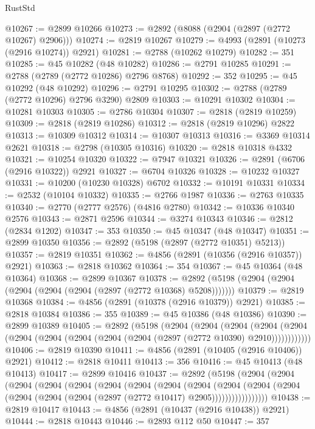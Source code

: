 \begin{lexlean}{RustStd}
\begin{coremodule}
@10267 := @2899 @10266
@10273 := @2892 (@8088 (@2904 (@2897 (@2772 @10267) @2906)))
@10274 := @2819 @10267
@10279 := @4993 (@2891 (@10273 (@2916 @10274)) @2921)
@10281 := @2788 (@10262 @10279)
@10282 := 351
@10285 := @45 @10282 (@48 @10282)
@10286 := @2791 @10285
@10291 := @2788 (@2789 (@2772 @10286) @2796 @8768)
@10292 := 352
@10295 := @45 @10292 (@48 @10292)
@10296 := @2791 @10295
@10302 := @2788 (@2789 (@2772 @10296) @2796 @3290) @2809
@10303 := @10291 @10302
@10304 := @10281 @10303
@10305 := @2786 @10304
@10307 := @2818 (@2819 @10259)
@10309 := @2818 (@2819 @10286)
@10312 := @2818 (@2819 @10296) @2822
@10313 := @10309 @10312
@10314 := @10307 @10313
@10316 := @3369 @10314 @2621
@10318 := @2798 (@10305 @10316)
@10320 := @2818 @10318 @4332
@10321 := @10254 @10320
@10322 := @7947 @10321
@10326 := @2891 (@6706 (@2916 @10322)) @2921
@10327 := @6704 @10326
@10328 := @10232 @10327
@10331 := @10200 (@10230 @10328) @6702
@10332 := @10191 @10331
@10334 := @2532 (@10104 @10332)
@10335 := @2766 @1987
@10336 := @2763 @10335
@10340 := @2770 (@2777 @2576) (@4816 @2780)
@10342 := @10336 @10340 @2576
@10343 := @2871 @2596
@10344 := @3274 @10343
@10346 := @2812 (@2834 @1202)
@10347 := 353
@10350 := @45 @10347 (@48 @10347)
@10351 := @2899 @10350
@10356 := @2892 (@5198 (@2897 (@2772 @10351) @5213))
@10357 := @2819 @10351
@10362 := @4856 (@2891 (@10356 (@2916 @10357)) @2921)
@10363 := @2818 @10362
@10364 := 354
@10367 := @45 @10364 (@48 @10364)
@10368 := @2899 @10367
@10378 := @2892 (@5198 (@2904 (@2904 (@2904 (@2904 (@2904 (@2897 (@2772 @10368) @5208)))))))
@10379 := @2819 @10368
@10384 := @4856 (@2891 (@10378 (@2916 @10379)) @2921)
@10385 := @2818 @10384
@10386 := 355
@10389 := @45 @10386 (@48 @10386)
@10390 := @2899 @10389
@10405 := @2892
    (@5198
      (@2904
        (@2904
          (@2904
            (@2904 (@2904 (@2904 (@2904 (@2904 (@2904 (@2904 (@2897 (@2772 @10390) @2910))))))))))))
@10406 := @2819 @10390
@10411 := @4856 (@2891 (@10405 (@2916 @10406)) @2921)
@10412 := @2818 @10411
@10413 := 356
@10416 := @45 @10413 (@48 @10413)
@10417 := @2899 @10416
@10437 := @2892
    (@5198
      (@2904
        (@2904
          (@2904
            (@2904
              (@2904
                (@2904
                  (@2904
                    (@2904
                      (@2904
                        (@2904
                          (@2904
                            (@2904 (@2904 (@2904 (@2904 (@2897 (@2772 @10417) @2905)))))))))))))))))
@10438 := @2819 @10417
@10443 := @4856 (@2891 (@10437 (@2916 @10438)) @2921)
@10444 := @2818 @10443
@10446 := @2893 @112 @50
@10447 := 357

\end{coremodule}
\end{lexlean}
